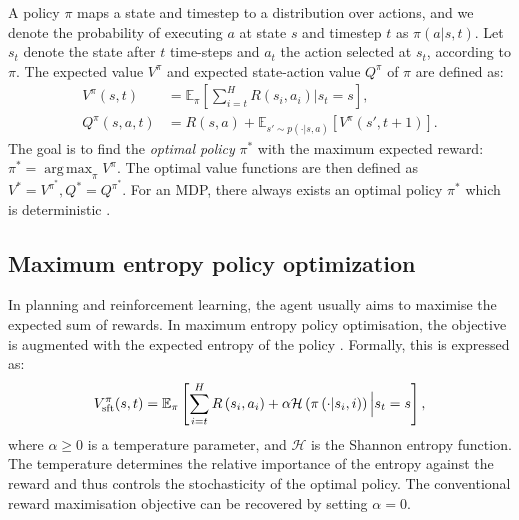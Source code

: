 \documentclass{article}
\newcommand{\bb}[1]{\mathbb{#1}}
\newcommand{\cl}[1]{\mathcal{#1}}
\newcommand{\Vsp}[2]{V^{#2}_{\textnormal{sft}}(#1)}
\DeclareMathOperator*{\argmax}{arg\,max}
\theoremstyle{plain}
\begin{document}
        A policy $\pi$ maps a state and timestep to a distribution over actions, and we denote the probability of executing $a$  at state $s$ and timestep $t$ as $\pi(a | s,t)$.
        Let $s_t$ denote the state after $t$ time-steps and $a_t$ the action selected at $s_t$, according to $\pi$. The expected value $V^{\pi}$ and expected state-action value $Q^{\pi}$ of  $\pi$ are defined as: 
        \begin{align}
            V^{\pi}(s, t) &= \bb{E}_{\pi} \left[\sum_{i=t}^{H} R\left(s_{i}, a_{i}\right) \Big\vert s_t=s \right], \\
            Q^{\pi}(s,a,t) &= R(s,a) + \bb{E}_{s'\sim p(\cdot | s,a)}[V^{\pi}(s',t+1)].
        \end{align}
        The goal is to find the \textit{optimal policy} $\pi^*$ with the maximum expected reward: $\pi^{*}=\argmax_{\pi} V^{\pi}$. The optimal value functions are then defined as $V^*=V^{\pi^*}, Q^*=Q^{\pi^*}$. 
        For an MDP, there always exists an optimal policy $\pi^{*}$ which is deterministic \cite{kolobov2012planning}.
        
    
    
    
    \subsection{Maximum entropy policy optimization}
        In planning and reinforcement learning, the agent usually aims to maximise the expected sum of rewards. In maximum entropy policy optimisation, the objective is augmented with the expected entropy of the policy \cite{haarnoja2017reinforcement, ziebart2008maximum}. Formally, this is expressed as:
        \begin{align}
            \Vsp{s,t}{\pi} = \bb{E}_{\pi} \left[\sum_{i=t}^{H} R\left(s_{i}, a_{i}\right)+ \alpha \mathcal{H}\left(\pi\left(\cdot|s_{i}, i\right)\right) \Big\vert s_t=s\right], \label{eq:vsft_def}
        \end{align}
        \noindent where $\alpha\geq 0$ is a temperature parameter, and $\cl{H}$ is the Shannon entropy function. The temperature determines the relative importance of the entropy against the reward and thus controls the stochasticity of the optimal policy. The conventional reward maximisation objective can be recovered by setting $\alpha = 0$. %
        
\end{document}
